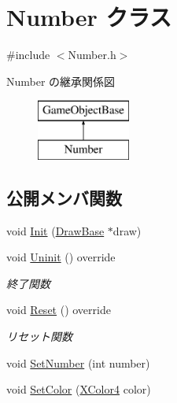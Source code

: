 \hypertarget{class_number}{}\section{Number クラス}
\label{class_number}


{\ttfamily \#include $<$Number.\+h$>$}

Number の継承関係図\begin{figure}[H]
\begin{center}
\leavevmode
\includegraphics[height=2.000000cm]{class_number}
\end{center}
\end{figure}
\subsection*{公開メンバ関数}
\begin{DoxyCompactItemize}
\item 
void \mbox{\hyperlink{class_number_ad92c9038810d0f831fdb9b5b13901b79}{Init}} (\mbox{\hyperlink{class_draw_base}{Draw\+Base}} $\ast$draw)
\item 
void \mbox{\hyperlink{class_number_a7c3bf9c55f7a0a19d80129c5f07f99f2}{Uninit}} () override
\begin{DoxyCompactList}\small\item\em 終了関数 \end{DoxyCompactList}\item 
void \mbox{\hyperlink{class_number_a7c6facdb1b3d0acc8309e0a915863d44}{Reset}} () override
\begin{DoxyCompactList}\small\item\em リセット関数 \end{DoxyCompactList}\item 
void \mbox{\hyperlink{class_number_ac825b1ee1f46a6ac4ffd3bc904964745}{Set\+Number}} (int number)
\item 
void \mbox{\hyperlink{class_number_a1ea98cdee888a040f4530a6654657c44}{Set\+Color}} (\mbox{\hyperlink{_vector3_d_8h_a680c30c4a07d86fe763c7e01169cd6cc}{X\+Color4}} color)
\end{DoxyCompactItemize}
